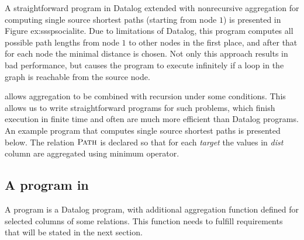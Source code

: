 A straightforward program in Datalog extended with nonrecursive aggregation for computing single source shortest paths (starting from node $1$) is presented in Figure {ex:ssspsocialite}. Due to limitations of Datalog, this program computes all possible path lengths from node $1$ to other nodes in the first place, and after that for each node the minimal distance is chosen. Not only this approach results in bad performance, but causes the program to execute infinitely if a loop in the graph is reachable from the source node.


\datalogra allows aggregation to be combined with recursion under some conditions. This allows us to write straightforward programs for such problems, which finish execution in finite time and often are much more efficient than Datalog programs. An example \datalogra program that computes single source shortest paths is presented below. The relation $\textsc{Path}$ is declared so that for each \textit{target} the values in \textit{dist} column are aggregated using minimum operator.




\subsection{A program in \datalogra}
A \datalogra program is a Datalog program, with additional aggregation function defined for selected columns of some relations. This function needs to fulfill requirements that will be stated in the next section.


